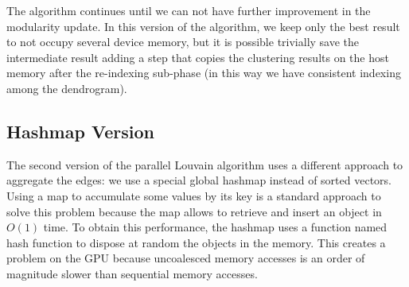 The algorithm continues until we can not have further improvement in the modularity update. In this version of the algorithm, we keep only the best result to not occupy several device memory, but it is possible trivially save the intermediate result adding a step that copies the clustering results on the host memory after the re-indexing sub-phase (in this way we have consistent indexing among the dendrogram).
\subsection{Hashmap Version}
The second version of the parallel Louvain algorithm uses a different approach to aggregate the edges: we use a special global hashmap instead of sorted vectors.
Using a map to accumulate some values by its key is a standard approach to solve this problem because the map allows to retrieve and insert an object in $O(1)$ time. 
To obtain this performance, the hashmap uses a function named hash function to dispose at random the objects in the memory. This creates a problem on the GPU because uncoalesced memory accesses is an order of magnitude slower than sequential memory accesses. 
